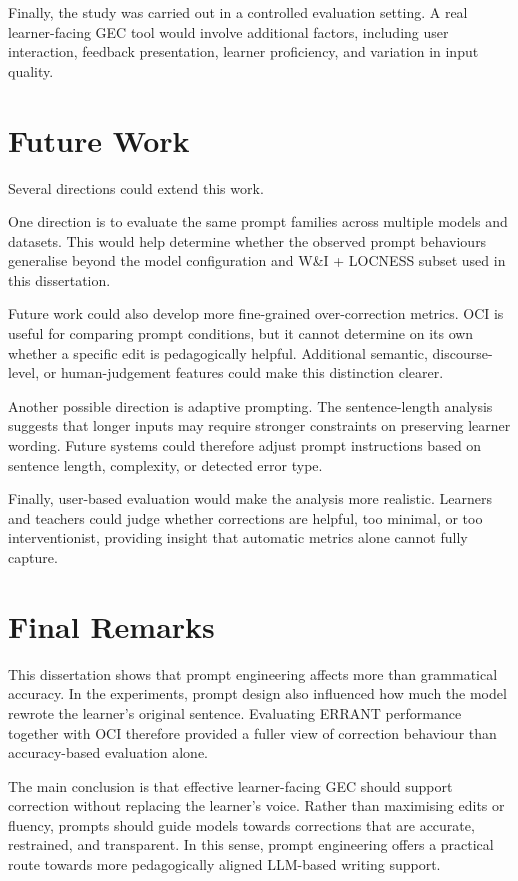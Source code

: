 Finally, the study was carried out in a controlled evaluation setting. A real learner-facing GEC tool would involve additional factors, including user interaction, feedback presentation, learner proficiency, and variation in input quality.

\section{Future Work}

Several directions could extend this work.

One direction is to evaluate the same prompt families across multiple models and datasets. This would help determine whether the observed prompt behaviours generalise beyond the model configuration and W\&I + LOCNESS subset used in this dissertation.

Future work could also develop more fine-grained over-correction metrics. OCI is useful for comparing prompt conditions, but it cannot determine on its own whether a specific edit is pedagogically helpful. Additional semantic, discourse-level, or human-judgement features could make this distinction clearer.

Another possible direction is adaptive prompting. The sentence-length analysis suggests that longer inputs may require stronger constraints on preserving learner wording. Future systems could therefore adjust prompt instructions based on sentence length, complexity, or detected error type.

Finally, user-based evaluation would make the analysis more realistic. Learners and teachers could judge whether corrections are helpful, too minimal, or too interventionist, providing insight that automatic metrics alone cannot fully capture.

\section{Final Remarks}

This dissertation shows that prompt engineering affects more than grammatical accuracy. In the experiments, prompt design also influenced how much the model rewrote the learner's original sentence. Evaluating ERRANT performance together with OCI therefore provided a fuller view of correction behaviour than accuracy-based evaluation alone.

The main conclusion is that effective learner-facing GEC should support correction without replacing the learner's voice. Rather than maximising edits or fluency, prompts should guide models towards corrections that are accurate, restrained, and transparent. In this sense, prompt engineering offers a practical route towards more pedagogically aligned LLM-based writing support.
